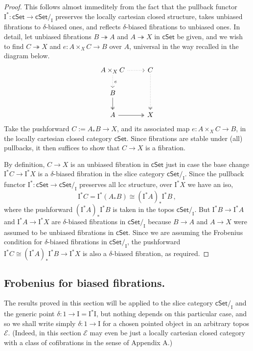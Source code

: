 \documentclass[11pt,reqno]{amsart}
\newcommand{\EE}{\ensuremath{\mathcal{E}}}
\newcommand{\cSet}{\ensuremath{\mathsf{cSet}}}
\newcommand{\ra}{\ensuremath{\rightarrow}}
\newcommand{\fib}{\ensuremath{\twoheadrightarrow}}
\renewcommand{\to}{\ensuremath{\rightarrow}}
\newcommand{\I}{\ensuremath{\mathrm{I}}}
\theoremstyle{remark}
\theoremstyle{definition}
\begin{document}
\begin{proof}
This follows almost immeditely from the fact that the pullback functor $\I^* : \cSet \to \cSet/_\I$ preserves the locally cartesian closed structure, takes unbiased fibrations to $\delta$-biased ones, and reflects $\delta$-biased fibrations to unbiased ones.  In detail, let unbiased fibrations $B \fib A$ and $A \fib X$ in $\cSet$ be given, and we wish to find $C\fib X$ and $e : A\times_X C \to B$ over $A$, universal in the way recalled in the diagram below.
\begin{equation}\label{diagram:biasedFrobenius2unbiasedFrobenius}
\begin{tikzcd}
A \times_X C \ar[d, dotted, "e"] \ar[r, dotted] & C \ar[dd, two heads, dotted]\\
B \ar[d, two heads] &   \\
A \ar[r, two heads]  & X 
\end{tikzcd}
\end{equation}
%
Take the pushforward $C := A_*B \to X$, and its associated map $e : A\times_X C \to B$, in the locally cartesian closed category $\cSet$.  Since fibrations are stable under (all) pullbacks, it then suffices to show that $C\to X$ is a fibration.  

By definition, $C\to X$ is an unbiased fibration in $\cSet$ just in case the base change $\I^*C \to \I^*X$ is a $\delta$-biased fibration in the slice category $\cSet/_\I$.  Since the pullback functor $\I^* : \cSet \to \cSet/_\I$ preserves all lcc structure, over $\I^*X$ we have an iso,
\[
\I^*C = \I^*(A_*B) \cong (\I^*A)_*\I^*B\,,
\]
where the pushforward $(\I^*A)_*\I^*B$ is taken in the topos $\cSet/_\I$.  But $\I^*B \to \I^*A$ and $\I^*A \to \I^*X$ are $\delta$-biased fibrations in $\cSet/_\I$ because $B \to A$ and $A \to X$ were assumed to be unbiased fibrations in $\cSet$.  Since we are assuming the Frobenius condition for $\delta$-biased fibrations in $\cSet/_\I$, the pushforward $\I^*C \cong (\I^*A)_*\I^*B \to \I^*X$ is also a $\delta$-biased fibration, as required.
\end{proof}
  
\subsection*{Frobenius for biased fibrations.}

The results proved in this section will be applied to the slice category $\cSet/_\I$ and the generic point $\delta : 1 \ra \I = \I^*\I$, but nothing depends on this particular case, and so we shall write simply $\delta : 1\to \I$ for a chosen pointed object in an arbitrary topos $\EE$.  (Indeed, in this section $\EE$ may even be just a locally cartesian closed category with a class of cofibrations in the sense of Appendix A.)
\end{document}

